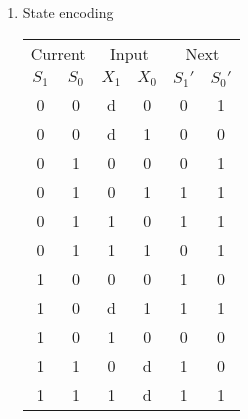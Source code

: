 \documentclass[12pt,letterpaper]{article}
\begin{document}
\begin{enumerate}
\begin{enumerate}
        \item
          State encoding

          \begin{tabular}{c c | c c | c c}
            \multicolumn{2}{c}{Current} & \multicolumn{2}{|c|}{Input} & \multicolumn{2}{c}{Next}\\
            $S_1$ & $S_0$ & $X_1$ & $X_0$ & $S_1'$ & $S_0'$ \\
            \hline
            0 & 0 & d & 0 & 0 & 1 \\
            0 & 0 & d & 1 & 0 & 0 \\
            0 & 1 & 0 & 0 & 0 & 1 \\
            0 & 1 & 0 & 1 & 1 & 1 \\
            0 & 1 & 1 & 0 & 1 & 1 \\
            0 & 1 & 1 & 1 & 0 & 1 \\
            1 & 0 & 0 & 0 & 1 & 0 \\
            1 & 0 & d & 1 & 1 & 1 \\
            1 & 0 & 1 & 0 & 0 & 0 \\
            1 & 1 & 0 & d & 1 & 0 \\
            1 & 1 & 1 & d & 1 & 1 \\
          \end{tabular}
      \end{enumerate}

  \end{enumerate}
\end{document}
